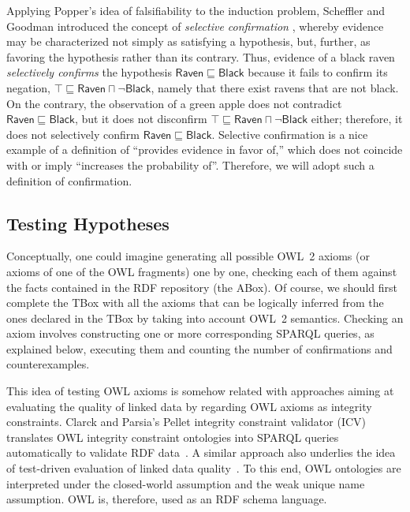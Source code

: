 \documentclass[a4paper]{article}
\newcounter{ex}
\begin{document}
Applying Popper's idea of falsifiability to the induction problem,
Scheffler and Goodman introduced the concept of \emph{selective confirmation}
\cite{SchefflerGoodman1972}, whereby evidence may be characterized
not simply as satisfying a hypothesis, but, further, as favoring the hypothesis
rather than its contrary.
Thus, evidence of a black raven \emph{selectively confirms} the hypothesis
$\mathsf{Raven} \sqsubseteq \mathsf{Black}$ because it fails to confirm its
negation, $\top \sqsubseteq \mathsf{Raven} \sqcap \neg\mathsf{Black}$, namely
that there exist ravens that are not black. On the contrary, the observation of
a green apple does not contradict $\mathsf{Raven} \sqsubseteq \mathsf{Black}$,
but it does not disconfirm $\top \sqsubseteq \mathsf{Raven} \sqcap \neg\mathsf{Black}$
either; therefore, it does not selectively confirm $\mathsf{Raven} \sqsubseteq \mathsf{Black}$.
Selective confirmation is a nice example of a definition of ``provides evidence in favor of,''
which does not coincide with or imply ``increases the probability of''.
Therefore, we will adopt such a definition of confirmation.

\subsection{Testing Hypotheses}

Conceptually, one could imagine generating all possible OWL~2 axioms (or axioms of
one of the OWL fragments) one by one,
checking each of them against the facts contained in the RDF repository (the ABox).
Of course, we should first complete the TBox with all the axioms that can be
logically inferred from the ones declared in the TBox by taking into account OWL~2 semantics.
Checking an axiom involves constructing one or more corresponding SPARQL queries,
as explained below, executing them and counting the number of confirmations and counterexamples.

This idea of testing OWL axioms is somehow related with approaches aiming at evaluating
the quality of linked data by regarding OWL axioms as integrity constraints.
Clarck and Parsia's Pellet integrity constraint validator (ICV) translates OWL integrity constraint
ontologies into SPARQL queries automatically to validate RDF data~\cite{SirinTao2009}.
A similar approach also underlies the idea of test-driven evaluation of linked data
quality~\cite{KontokostasWestphalAuerHellmannLehmannCornelissen2014}.
To this end, OWL ontologies are interpreted under the closed-world assumption and
the weak unique name assumption. OWL is, therefore, used as an RDF schema language.
\end{document}
